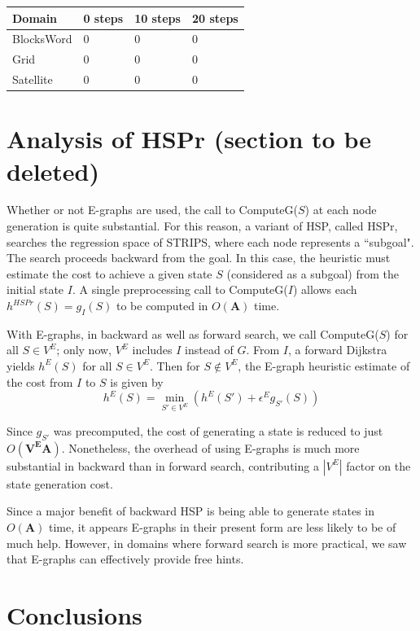 \documentclass[letterpaper]{article}
\begin{document}
\begin{center}
    \begin{tabular}{| l | l | l | l |}
    \hline
    Domain & 0 steps & 10 steps & 20 steps
    \\ \hline
    BlocksWord & 0 & 0 & 0
    \\ \hline
    Grid & 0 & 0 & 0
    \\ \hline
    Satellite & 0 & 0 & 0
    \\ \hline
    \end{tabular}
\end{center}

\section{Analysis of HSPr (section to be deleted)}

Whether or not E-graphs are used, the call to ComputeG($S$) at each node generation is quite substantial. For this reason, a variant of HSP, called HSPr, searches the regression space of STRIPS, where each node represents a ``subgoal". The search proceeds backward from the goal. In this case, the heuristic must estimate the cost to achieve a given state $S$ (considered as a subgoal) from the initial state $I$. A single preprocessing call to ComputeG($I$) allows each $h^{HSPr}(S) = g_I(S)$ to be computed in $O(\mathbf{A})$ time.

With E-graphs, in backward as well as forward search, we call ComputeG($S$) for all $S\in V^E$; only now, $V^E$ includes $I$ instead of $G$. From $I$, a forward Dijkstra yields $h^E(S)$ for all $S\in V^E$. Then for $S\notin V^E$, the E-graph heuristic estimate of the cost from $I$ to $S$ is given by
\[h^E(S) = \min_{S'\in V^E}\left(h^E(S') + \epsilon^E g_{S'}(S) \right)\]

Since $g_{S'}$ was precomputed, the cost of generating a state is reduced to just $O(\mathbf{V^EA})$. Nonetheless, the overhead of using E-graphs is much more substantial in backward than in forward search, contributing a $|V^E|$ factor on the state generation cost.

Since a major benefit of backward HSP is being able to generate states in $O(\mathbf{A})$ time, it appears E-graphs in their present form are less likely to be of much help. However, in domains where forward search is more practical, we saw that E-graphs can effectively provide free hints.

\section{Conclusions}
\end{document}

